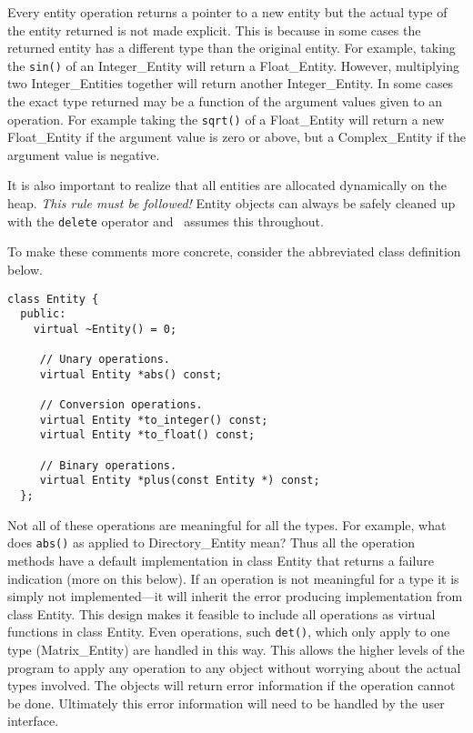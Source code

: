 \documentclass{report}
\begin{document}
Every entity operation returns a pointer to a new entity but the actual type of the entity
returned is not made explicit. This is because in some cases the returned entity has a different
type than the original entity. For example, taking the \texttt{sin()} of an Integer\_Entity will
return a Float\_Entity. However, multiplying two Integer\_Entities together will return another
Integer\_Entity. In some cases the exact type returned may be a function of the argument values
given to an operation. For example taking the \texttt{sqrt()} of a Float\_Entity will return a
new Float\_Entity if the argument value is zero or above, but a Complex\_Entity if the argument
value is negative.

It is also important to realize that all entities are allocated dynamically on the heap.
\emph{This rule must be followed!} Entity objects can always be safely cleaned up with the
\texttt{delete} operator and \CLAC\ assumes this throughout.

To make these comments more concrete, consider the abbreviated class definition below.

\begin{verbatim}
class Entity {
  public:
    virtual ~Entity() = 0;

     // Unary operations.
     virtual Entity *abs() const;

     // Conversion operations.
     virtual Entity *to_integer() const;
     virtual Entity *to_float() const;

     // Binary operations.
     virtual Entity *plus(const Entity *) const;
  };
\end{verbatim}

Not all of these operations are meaningful for all the types. For example, what does
\texttt{abs()} as applied to Directory\_Entity mean? Thus all the operation methods have a
default implementation in class Entity that returns a failure indication (more on this below).
If an operation is not meaningful for a type it is simply not implemented---it will inherit the
error producing implementation from class Entity. This design makes it feasible to include all
operations as virtual functions in class Entity. Even operations, such \texttt{det()}, which
only apply to one type (Matrix\_Entity) are handled in this way. This allows the higher levels
of the program to apply any operation to any object without worrying about the actual types
involved. The objects will return error information if the operation cannot be done. Ultimately
this error information will need to be handled by the user interface.
\end{document}
